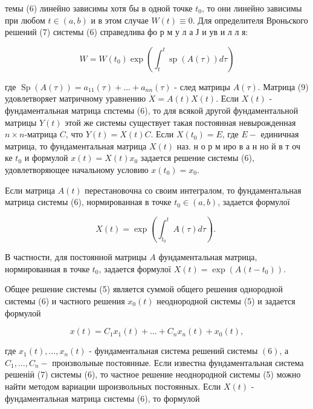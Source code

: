 \documentclass[10pt]{article}
\begin{document}
темы (6) линейно зависимы хотя бы в одной точке $t_{0}$, то они линейно зависимы при любом $t \in(a, b)$ и в этом случае $W(t) \equiv 0$. Для определителя Вроньского решений (7) системы (6) справедлива фо р м у л а Ј и ув и л л я:



\[

W=W\left(t_{0}\right) \exp \left(\int_{t}^{t} \operatorname{sp}(A(\tau)) d \tau\right)

\]



где $\operatorname{Sp}(A(\tau))=a_{11}(\tau)+\ldots+a_{n n}(\tau)$ - след матрицы $A(\tau)$. Матрица (9) удовлетворяет матричному уравнению $\dot{X}=A(t) X(t)$. Если $X(t)$ - фундаментальная матрица спстемы (6), то для всякой другой фундаментальной матрицы $Y(t)$ этой же системы существует такая постоянная невырожденная $n \times n$-матрица $C$, что $Y(t)=X(t) C$. Если $X\left(t_{0}\right)=E$, где $E-$ единичная матрица, то фундаментальная матрица $X(t)$ наз. н о р м иро в а н но й в т оч ке $t_{0}$ и формулой $x(t)=X(t) x_{0}$ задается решение системы (6), удовлетворяющее начальному условию $x\left(t_{0}\right)=x_{0}$.



Если матрица $A(t)$ перестановочна со своим интегралом, то фундаментальная матрица системы (6), нормированная в точке $t_{0} \in(a, b)$, задается формулої



\[

X(t)=\exp \left(\int_{t_{0}}^{t} A(\tau) d \tau\right) \text {. }

\]



В частности, для постоянной матрицы $A$ фундаментальная матрица, нормированная в точке $t_{0}$, задается формулої $X(t)=\exp \left(A\left(t-t_{0}\right)\right)$.



Общее решение системы (5) является суммой общего решения однородной системы (6) и частного решения $x_{0}(t)$ неоднородной системы (5) и задается формулой



\[

x(t)=C_{1} x_{1}(t)+\ldots+C_{n} x_{n}(t)+x_{0}(t),

\]



где $x_{1}(t), \ldots, x_{n}(t)$ - фундаментальная система решений системы $(6)$, а $C_{1}, \ldots, C_{n}-$ произвольные постоянные. Если известна фундаментальная система решеніӥ (7) системы (6), то частное решение неоднородной системы (5) можно найти методом вариации шроизвольных постоянных. Если $X(t)$ - фундаментальная матрица системы (6), то формулой
\end{document}
